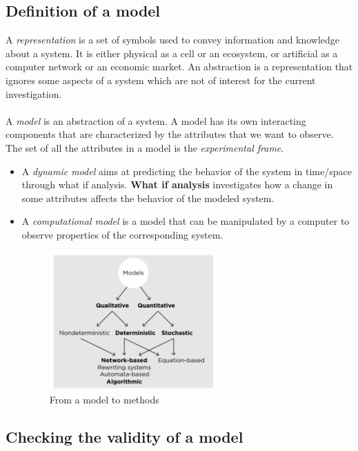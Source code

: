 \subsection{Definition of a model}

A \emph{representation} is a set of symbols used to convey information
and knowledge about a system. It is either physical as a cell or an
ecosystem, or artificial as a computer network or an economic market. An
abstraction is a representation that ignores some aspects of a system
which are not of interest for the current investigation.
\\
\\
\noindent
A \emph{model} is an abstraction of a system. A model has its own interacting
components that are characterized by the attributes that we want to
observe. The set of all the attributes in a model is the
\emph{experimental frame}.

\begin{itemize}
\item
  A \emph{dynamic model} aims at predicting the behavior of the system
  in time/space through what if analysis. \textbf{What if analysis} investigates
  how a change in some attributes affects the behavior of the modeled
  system.
\item
  A \emph{computational model} is a model that can be manipulated by a
  computer to observe properties of the corresponding system.

  \begin{figure}
  \centering
  \includegraphics[width=0.6\textwidth]{scheme_model.png}
  \caption{From a model to methods}
  \end{figure}
\end{itemize}


\subsection{Checking the validity of a model}

